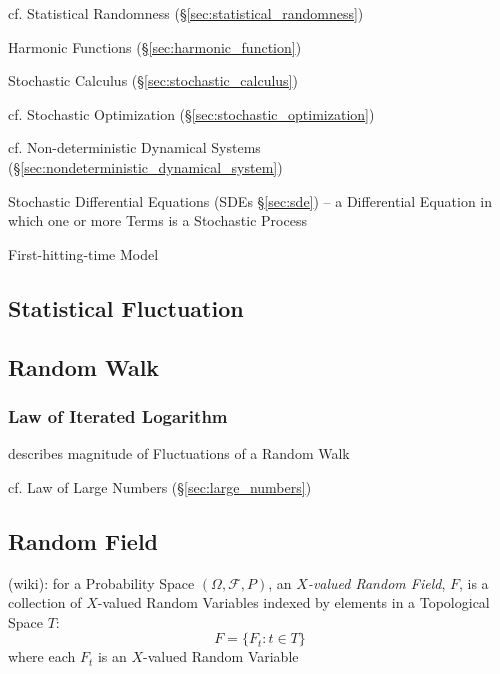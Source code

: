 cf. Statistical Randomness (\S\ref{sec:statistical_randomness})

Harmonic Functions (\S\ref{sec:harmonic_function})

\fist Stochastic Calculus (\S\ref{sec:stochastic_calculus})

\fist cf. Stochastic Optimization (\S\ref{sec:stochastic_optimization})

\fist cf. Non-deterministic Dynamical Systems
(\S\ref{sec:nondeterministic_dynamical_system})

\fist Stochastic Differential Equations (SDEs \S\ref{sec:sde}) -- a Differential
Equation in which one or more Terms is a Stochastic Process

First-hitting-time Model



\subsection{Statistical Fluctuation}\label{sec:statistical_fluctuation}

\subsection{Random Walk}\label{sec:random_walk}

\subsubsection{Law of Iterated Logarithm}\label{sec:iterated_logarithm}

describes magnitude of Fluctuations of a Random Walk

cf. Law of Large Numbers (\S\ref{sec:large_numbers})



\subsection{Random Field}\label{sec:random_field}

(wiki): for a Probability Space $(\Omega, \mathcal{F}, P)$, an \emph{$X$-valued
  Random Field}, $F$, is a collection of $X$-valued Random Variables indexed by
elements in a Topological Space $T$:
\[
  F = \{ F_t : t \in T \}
\]
where each $F_t$ is an $X$-valued Random Variable

